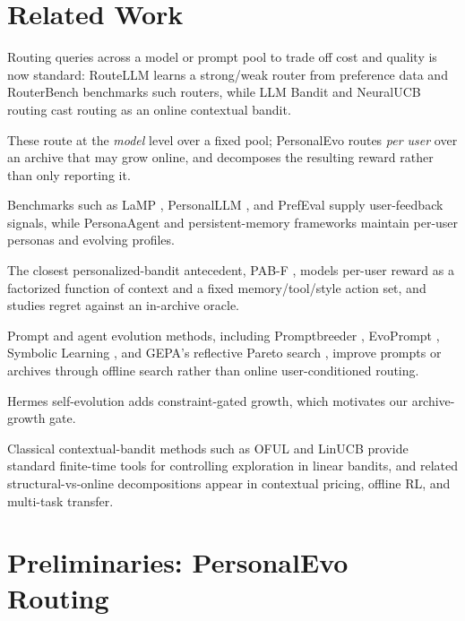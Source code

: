 \documentclass{article} %
\begin{document}
\section{Related Work}

\label{sec:related}

Routing queries across a model or prompt pool to trade off cost and quality is now standard: RouteLLM \citep{ong2024routellm} learns a strong/weak router from preference data and RouterBench \citep{hu2024routerbench} benchmarks such routers, while LLM Bandit \citep{li2025llmbandit} and NeuralUCB routing \citep{tsai2026neuralucb} cast routing as an online contextual bandit.

These route at the \emph{model} level over a fixed pool; PersonalEvo routes \emph{per user} over an archive that may grow online, and decomposes the resulting reward rather than only reporting it.

Benchmarks such as LaMP \citep{salemi2023lamp}, PersonalLLM \citep{zollo2024personalllm}, and PrefEval \citep{zhao2025prefeval} supply user-feedback signals, while PersonaAgent \citep{zhang2025personaagent} and persistent-memory frameworks \citep{westhausser2025persistent} maintain per-user personas and evolving profiles.

The closest personalized-bandit antecedent, PAB-F \citep{jin2026personalizing}, models per-user reward as a factorized function of context and a fixed memory/tool/style action set, and studies regret against an in-archive oracle.

Prompt and agent evolution methods, including Promptbreeder \citep{fernando2023promptbreeder}, EvoPrompt \citep{guo2024evoprompt}, Symbolic Learning \citep{zhou2024symbolic}, and GEPA's reflective Pareto search \citep{agrawal2025geparp}, improve prompts or archives through offline search rather than online user-conditioned routing.

Hermes self-evolution \citep{hermes_selfevolution,hermes_agent} adds constraint-gated growth, which motivates our archive-growth gate.

Classical contextual-bandit methods such as OFUL and LinUCB \citep{abbasi2011oful,chu2011linucb,li2010contextual} provide standard finite-time tools for controlling exploration in linear bandits, and related structural-vs-online decompositions appear in contextual pricing, offline RL, and multi-task transfer.

\section{Preliminaries: PersonalEvo Routing}
\label{sec:background}
\end{document}
